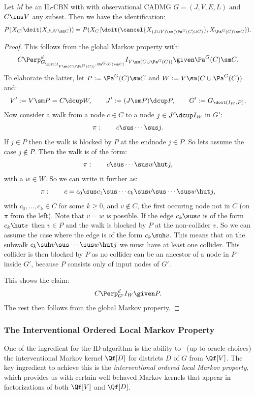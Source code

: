 \begin{Lem}
    \label{lem:C-intPaC}
    Let $M$ be an IL-CBN with with observational CADMG $G=(J,V,E,L)$ and $C \ins V$ any subset.
    Then we have the identification:
    \[ P(X_C|\doit(X_{J \cup V \sm C})) = P(X_C|\doit(\cancel{X_{(J \cup V) \sm (\Pa^G(C) \cup C)}}, X_{\Pa^G(C)\sm C})). \]
    \begin{proof}
        This follows from the global Markov property with:
        \[ C \Perp^d_{G_{\doit(I_{V \sm (C \cup \Pa^G(C))},\Pa^G(C)\sm C)}} I_{V \sm (C \cup \Pa^G(C))} \given \Pa^G(C)\sm C.\]
        To elaborate the latter, let $P:=\Pa^G(C)\sm C$ and $W := V \sm (C \cup \Pa^G(C))$ and:
        \[ V':=V \sm P= C \dcup W, \qquad J':= (J\sm P) \dcup P, \qquad G':=G_{\doit(I_W,P)}.\]
        Now consider a walk from a node $c \in C$ to a node $j \in J' \dcup I_W$ in $G'$:
        \[\pi:\qquad c \sus \cdots \sus j.\]
        If $j \in P$ then the walk is blocked by $P$ at the endnode $j \in P$.
        So lets assume the case $j \notin P$. Then the walk is of the form:
        \[\pi:\qquad c \sus \cdots \sus w \hut j,\]
        with a $w \in W$. So we can write it further as:
        \[\pi:\qquad c =c_0 \sus c_1 \sus \cdots c_k \sus v \sus \cdots \sus w \hut j,\]
        with $c_0,\dots,c_k \in C$ for some $k \ge 0$, and $v \notin C$, the first occuring node not in $C$ (on $\pi$ from the left). 
        Note that $v=w$ is possible.
        If the edge $c_k \sus v$ is of the form $c_k \hut v$ then $v \in P$ and the walk is blocked by $P$ at the non-collider $v$.
        So we can assume the case where the edge is of the form $c_k \suh v$. 
        This means that on the subwalk $c_k \suh v \sus \cdots \sus w \hut j$ we must have at least one collider.
        This collider is then blocked by $P$ as no collider can be an ancestor of a node in $P$ inside $G'$, because $P$ consists only of input nodes of $G'$. 

        This shows the claim:
        \[ C \Perp^d_{G'} I_W \given P.\]
        The rest then follows from the global Markov property.
    \end{proof}
\end{Lem}


\subsubsection{The Interventional Ordered Local Markov Property}

One of the ingredient for the ID-algorithm is the ability to \track\ (up to oracle choices) 
the interventional Markov kernel $\Qf[D]$  for districts $D$ of $G$ from $\Qf[V]$.
The key ingredient to achieve this is the \emph{interventional ordered local Markov property}, which
provides us with certain well-behaved Markov kernels that appear in factorizations of both $\Qf[V]$ and $\Qf[D]$.

